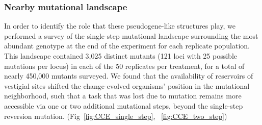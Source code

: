 \documentclass[PhD]{msu-thesis}
\begin{document}
\subsubsection{Nearby mutational landscape}

In order to identify the role that these pseudogene-like structures play, we performed a survey of the single-step mutational landscape surrounding the most abundant genotype at the end of the experiment for each replicate population. This landscape contained 3,025 distinct mutants (121 loci with 25 possible mutations per locus) in each of the 50 replicates per treatment, for a total of nearly 450,000 mutants surveyed. We found that the availability of reservoirs of vestigial sites shifted the change-evolved organisms' position in the mutational neighborhood, such that a task that was lost due to mutation remains more accessible via one or two additional mutational steps, beyond the single-step reversion mutation. (Fig~\ref{fig:CCE_single_step}, ~\ref{fig:CCE_two_step})
\end{document}
